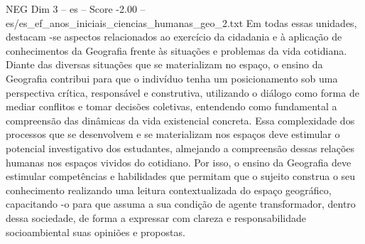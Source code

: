 \begin{textsample}{NEG Dim 3 – es – Score -2.00 – es/es\_ef\_anos\_iniciais\_ciencias\_humanas\_geo\_2.txt}  \label{ex:f3_neg_171}
Em todas essas unidades, destacam -se aspectos relacionados ao exercício da cidadania e à aplicação de conhecimentos da Geografia frente às situações e problemas da vida cotidiana.
Diante das diversas situações que se materializam no espaço, o ensino da Geografia contribui para que o indivíduo tenha um posicionamento sob uma perspectiva crítica, responsável e construtiva, utilizando o diálogo como forma de mediar conflitos e tomar decisões coletivas, entendendo como fundamental a compreensão das dinâmicas da vida existencial concreta.
Essa complexidade dos processos que se desenvolvem e se materializam nos espaços deve estimular o potencial investigativo dos estudantes, almejando a compreensão dessas relações humanas nos espaços vividos do cotidiano.
Por isso, o ensino da Geografia deve estimular competências e habilidades que permitam que o sujeito construa o seu conhecimento realizando uma leitura contextualizada do espaço geográfico, capacitando -o para que assuma a sua condição de agente transformador, dentro dessa sociedade, de forma a expressar com clareza e responsabilidade socioambiental suas opiniões e propostas.

\end{textsample}
